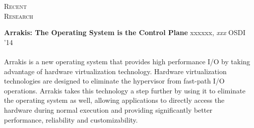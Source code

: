 \documentclass[10pt,times]{report}
\newlength{\sectiongap}
\newlength{\entrygap}
\newlength{\sectioncolwidth}
\newlength{\colgap}
\newlength{\stuffwidth}
\def\ifEqString#1#2{\def\testa{#1}\def\testb{#2}%
  \ifx\testa\testb}
\newenvironment{rtable}{
  \begin{minipage}{\textwidth}
  }{
  \end{minipage}
}
\newenvironment{rentry}[3][xxx]{
  \begin{minipage}[t]{\hsize}
    \textbf{#2}\ifEqString{#1}{xxx}\relax\else, \textit{#1}\fi
    \hspace{\stretch{1}} #3 \\
  }{
    \removelastskip
  \end{minipage}
  \\[\entrygap]  %
}
\newenvironment{rsection}[1]{
  \begin{minipage}[t]{\sectioncolwidth}
    \textsc{#1}
  \end{minipage}
  \hspace{\colgap}
  \begin{minipage}[t]{\stuffwidth}
  }{
    \removelastskip
  \end{minipage}
  \\[\sectiongap]
}
\begin{document}
\begin{rtable}
\begin{rsection}{Recent\\Research}

    \begin{rentry}{Arrakis: The Operating System is the Control
        Plane}{OSDI '14}
      \vspace{-.5em}\\
      Arrakis is a new operating system that provides high performance
      I/O by taking advantage of hardware virtualization
      technology. Hardware virtualization technologies are designed to
      eliminate the hypervisor from fast-path I/O operations. Arrakis
      takes this technology a step further by using it to eliminate
      the operating system as well, allowing applications to directly
      access the hardware during normal execution and providing
      significantly better performance, reliability and
      customizability.
    \end{rentry}
  \end{rsection}    
\end{rtable}
\end{document}
